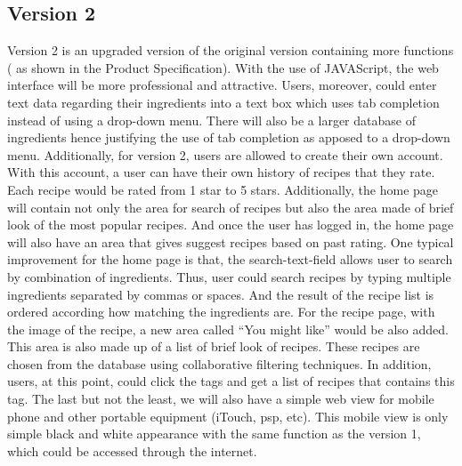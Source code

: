 \subsection{Version 2}
Version 2 is an upgraded version of the original version containing more functions ( as shown in the Product Specification). With the use of JAVAScript, the web interface will be more professional and attractive. Users, moreover, could enter text data regarding their ingredients into a text box which uses tab completion instead of using a drop-down menu. There will also be a larger database of ingredients hence justifying the use of tab completion as apposed to a drop-down menu.
Additionally, for version 2, users are allowed to create their own account. With this account, a user can have their own history of recipes that they rate. Each recipe would be rated from 1 star to 5 stars. Additionally, the home page will contain not only the area for search of recipes but also the area made of brief look of the most popular recipes. And once the user has logged in, the home page will also have an area that gives suggest recipes based on past rating. 
One typical improvement for the home page is that, the search-text-field allows user to search by combination of ingredients. Thus, user could search recipes by typing multiple ingredients separated by commas or spaces. And the result of the recipe list is ordered according how matching the ingredients are. 
For the recipe page, with the image of the recipe, a new area called “You might like” would be also added.  This area is also made up of a list of brief look of recipes. These recipes are chosen from the database using collaborative filtering techniques. In addition, users, at this point, could click the tags and get a list of recipes that contains this tag.
The last but not the least, we will also have a simple web view for mobile phone and other portable equipment (iTouch, psp, etc). This mobile view is only simple black and white appearance with the same function as the version 1, which could be accessed through the internet.

